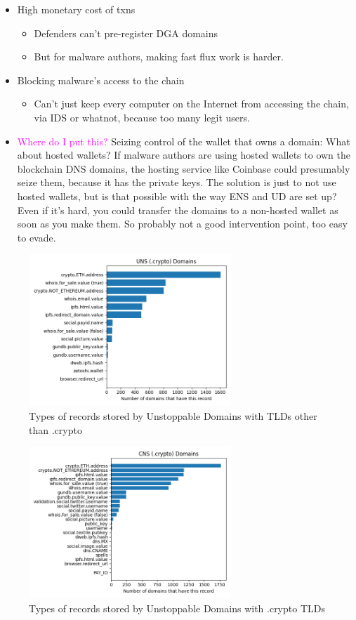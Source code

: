 \documentclass[10pt,sigconf,letterpaper]{acmart}
\newcommand{\randall}{\ding{110}\ding{43}\textcolor{magenta}}
\newcommand{\randall}{}
\begin{document}
\begin{itemize}
	\item High monetary cost of txns
	\begin{itemize}
		\item Defenders can't pre-register DGA domains
		\item But for malware authors, making fast flux work 
		is harder. 
	\end{itemize}
	\item Blocking malware's access to the chain
	\begin{itemize}
		\item Can't just keep every computer on the Internet 
		from accessing the chain, via IDS or whatnot, because 
		too many legit users.
	\end{itemize}
	\item \randall{Where do I put this?} Seizing control of 
	the wallet that owns a domain: 
	What about hosted wallets? If malware authors are using 
	hosted wallets to own the blockchain DNS domains, the 
	hosting service like Coinbase could presumably seize 
	them, because it has the private keys. The solution is 
	just to not use hosted wallets, but is that possible with 
	the way ENS and UD are set up? Even if it's hard, you 
	could transfer the domains to a non-hosted wallet as soon 
	as you make them. So probably not a good intervention 
	point, too easy to evade. 
\end{itemize}

\begin{figure}[t]
	\centering
	\includegraphics[width=3in]{uns_records.png}
	\caption{Types of records stored by Unstoppable 
	Domains with TLDs other than .crypto}
	\label{fig:uns_records}
\end{figure}
\begin{figure}[t]
	\centering
	\includegraphics[width=3in]{cns_records.png}
	\caption{Types of records stored by Unstoppable Domains 
	with .crypto TLDs}
	\label{fig:cns_records}
\end{figure}
\end{document}
